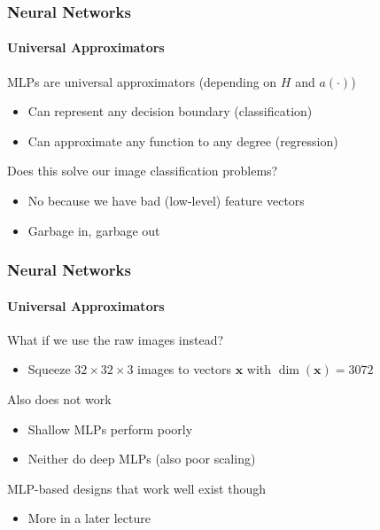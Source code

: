 \documentclass[xetex,professionalfont]{beamer}
\renewcommand\emph[1]{\textcolor{tuwcvl_cvl_blue}{#1}}
\renewcommand{\vec}[1]{\ensuremath{\mathbf{#1}}}
\newcommand{\vx}{\vec{x}}
\begin{document}
\begin{frame}
  \frametitle{Neural Networks}
  \framesubtitle{Universal Approximators}
  
  MLPs are \emph{universal approximators} (depending on $H$ and $a(\cdot)$)
  \begin{itemize}
      \item Can represent any decision boundary (classification)
      \item Can approximate any function to any degree (regression)
  \end{itemize}
  
  \bigskip
  
  Does this solve our image classification problems?
  \begin{itemize}
      \item No because we have bad (low-level) feature vectors
      \item Garbage in, garbage out
  \end{itemize}
  
  \end{frame}


\begin{frame}
  \frametitle{Neural Networks}
  \framesubtitle{Universal Approximators}
  
  What if we use the raw images instead?
  \begin{itemize}
    \item Squeeze $32\times32\times3$ images to vectors $\vx$ with $\dim(\vx)=3072$
\end{itemize}

\bigskip
  
Also does not work
\begin{itemize}
    \item Shallow MLPs perform poorly
    \item Neither do deep MLPs (also poor scaling) %
\end{itemize}

\bigskip
MLP-based designs that work well exist though
\begin{itemize}
  \item More in a later lecture
\end{itemize}
  
  \end{frame}
\end{document}
